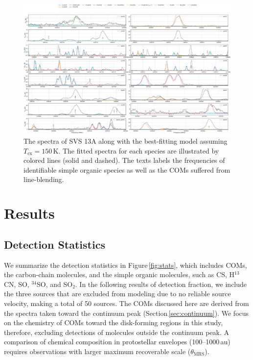 \documentclass[twocolumn]{aastex62}
\newcommand{\htcn}{\mbox{H$^{13}$CN}}
\begin{document}
\begin{figure}[htbp!]
  \centering
  \includegraphics[angle=90, height=\textheight]{Set2_ID00_150.pdf}
  \caption{The spectra of SVS 13A along with the best-fitting model assuming $T_\text{ex} = 150$\,K.  The fitted spectra for each species are illustrated by colored lines (solid and dashed).  The texts labels the frequencies of identifiable simple organic species as well as the COMs suffered from line-blending.}
  \label{fig:svs13a}
\end{figure}

\section{Results}
\label{sec:results}
\subsection{Detection Statistics}
We summarize the detection statistics in Figure\,\ref{fig:stats}, which includes COMs, the carbon-chain molecules, and the simple organic molecules, such as CS, \htcn, SO, $^{34}$SO, and SO$_{2}$.  In the following results of detection fraction, we include the three sources that are excluded from modeling due to no reliable source velocity, making a total of 50 sources.  The COMs discussed here are derived from the spectra taken toward the continuum peak (Section\,\ref{sec:continuum}).  We focus on the chemistry of COMs toward the disk-forming regions in this study, therefore, excluding detections of molecules outside the continuum peak.  A comparison of chemical composition in protostellar envelopes (100--1000\,au) requires observations with larger maximum recoverable scale ($\theta_\text{MRS}$).
\end{document}

